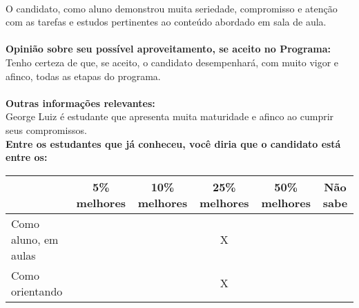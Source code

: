 \documentclass[11pt]{article}
\begin{document}
\\O candidato, como aluno demonstrou muita seriedade, compromisso e atenção com as tarefas e estudos pertinentes ao conteúdo abordado em sala de aula.\\
\\
\textbf{Opinião sobre seu possível aproveitamento, se aceito no Programa:}
\\Tenho certeza de que, se aceito, o candidato desempenhará, com muito vigor e afinco, todas as etapas do programa.\\ 
\\
\textbf{Outras informações relevantes:} \\George Luiz é estudante que apresenta muita maturidade e afinco ao cumprir seus compromissos.
\\[0.3cm]
\textbf{Entre os estudantes que já conheceu, você diria que o candidato está entre os:}
\\
\begin{tabular}{|l|c|c|c|c|c|}
\hline
 & 5\% melhores & 10\% melhores & 25\% melhores & 50\% melhores & Não sabe \\
\hline
Como aluno, em aulas &  &  & X &  & \\
\hline
Como orientando &  &  & X &  & \\
\hline
\end{tabular}
\end{document}
